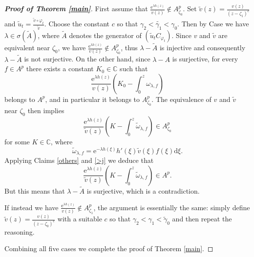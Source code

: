 \documentclass{amsart}
\theoremstyle{proclaim}
\theoremstyle{fancyproclaim}
\theoremstyle{definition}
\theoremstyle{fancystatement}
\numberwithin{equation}{section}
\begin{document}
\begin{proof}[\textbf{Proof of Theorem \ref{main}}]
First assume that  $\frac{\mathrm{e}^{\lambda h(z)}}{v(z)}\notin A^p_{\zeta_0}$. Set $\tilde{v}(z)=\frac{v(z)}{(z-\zeta_1)^c}$ and $\tilde{u}_t=\frac{\tilde{v}\circ\varphi_t}{\tilde{v}}$. Choose the constant $c$ so that $\gamma_2<\tilde{\gamma_1}<\gamma_0$. Then by Case \uppercase\expandafter{} we have $\lambda\in\sigma(\tilde{A})$, where $\tilde{A}$ denotes the generator of $(\tilde{u}_tC_{\varphi_t})$. Since $v$ and $\tilde{v}$ are equivalent near $\zeta_0$, we have $\frac{\mathrm{e}^{\lambda h(z)}}{v(z)}\notin A^p_{\zeta_0}$, thus $\lambda-\tilde{A}$ is injective and consequently $\lambda-\tilde{A}$ is not surjective. On the other hand, since $\lambda-A$ is surjective, for every $f\in A^p$ there exists a constant $K_0\in\mathbb{C}$ such that
$$\frac{ \mathrm{e}^{\lambda h(z)}}{v(z)}\left(K_0-\int_0^z \omega_{\lambda,f}\right)$$
belongs to $A^p$, and in particular it belongs to $A^p_{\zeta_0}$.  The equivalence of $v$ and $\tilde{v}$ near $\zeta_0$ then implies
$$\frac{ \mathrm{e}^{\lambda h(z)}}{\tilde{v}(z)}\left(K-\int_0^z \tilde{\omega}_{\lambda,f}\right)\in A_{\zeta_0}^p$$
for some $K\in\mathbb{C}$, where 
$$\tilde{\omega}_{\lambda,f}=\mathrm{e}^{-\lambda h(\xi)}h'(\xi)\tilde{v}(\xi)f(\xi) \mathrm{d}\xi.$$
Applying Claims \ref{others} and \ref{>j} we deduce that
$$\frac{ \mathrm{e}^{\lambda h(z)}}{\tilde{v}(z)}\left(K-\int_0^z \tilde{\omega}_{\lambda,f}\right)\in A^p.$$
But this means that $\lambda-\tilde{A}$ is surjective, which is a contradiction.

If instead we have $\frac{\mathrm{e}^{\lambda h(z)}}{v(z)}\notin A^p_{\zeta_1}$, the argument is essentially the same: simply define $\tilde{v}(z)=\frac{v(z)}{(z-\zeta_0)^c}$ with a suitable $c$ so that $\gamma_2<\gamma_1<\tilde{\gamma}_0$ and then repeat the reasoning.

Combining all five cases we complete the proof of Theorem \ref{main}.
\end{proof}
\end{document}
